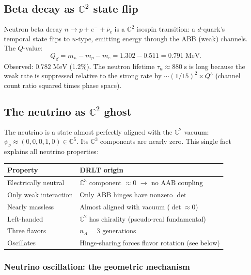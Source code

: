 \documentclass[12pt]{article}
\theoremstyle{remark}
\theoremstyle{definition}
\begin{document}
\subsection{Beta decay as $\mathbb{C}^2$ state flip}

Neutron beta decay $n \to p + e^- + \bar{\nu}_e$ is a $\mathbb{C}^2$ isospin transition: a $d$-quark's temporal state flips to $u$-type, emitting energy through the ABB (weak) channels. The $Q$-value:
\begin{equation}
Q_\beta = m_n - m_p - m_e = 1.302 - 0.511 = 0.791\;\text{MeV}.
\end{equation}
Observed: $0.782\;\text{MeV}$ (1.2\%). The neutron lifetime $\tau_n \approx 880\;\text{s}$ is long because the weak rate is suppressed relative to the strong rate by $\sim(1/15)^2 \times Q^5$ (channel count ratio squared times phase space).

\subsection{The neutrino as $\mathbb{C}^2$ ghost}

The neutrino is a state almost perfectly aligned with the $\mathbb{C}^2$ vacuum: $\psi_\nu \approx (0, 0, 0, 1, 0) \in \mathbb{C}^5$. Its $\mathbb{C}^3$ components are nearly zero. This single fact explains all neutrino properties:

\begin{center}
\begin{tabular}{ll}
\hline
Property & DRLT origin \\
\hline
Electrically neutral & $\mathbb{C}^3$ component $\approx 0$ $\to$ no AAB coupling \\
Only weak interaction & Only ABB hinges have nonzero $\det$ \\
Nearly massless & Almost aligned with vacuum ($\det \approx 0$) \\
Left-handed & $\mathbb{C}^2$ has chirality (pseudo-real fundamental) \\
Three flavors & $n_A = 3$ generations \\
Oscillates & Hinge-sharing forces flavor rotation (see below) \\
\hline
\end{tabular}
\end{center}

\subsubsection{Neutrino oscillation: the geometric mechanism}
\end{document}
